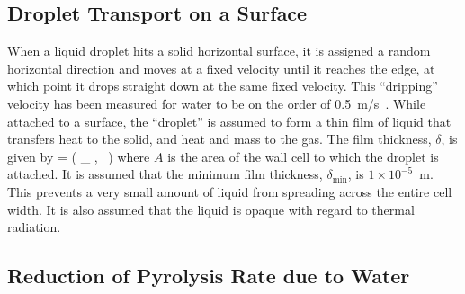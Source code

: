 \subsection{Droplet Transport on a Surface}

When a liquid droplet hits a solid horizontal surface, it is assigned a
random horizontal direction and moves at a fixed velocity until it
reaches the edge, at which point it drops straight down at the same
fixed velocity. This ``dripping'' velocity has been measured for water to be on
the order of 0.5~m/s~\cite{Hamins:1,Hamins:IAFSS2002}.
While attached to a surface, the ``droplet'' is assumed to form a thin film of liquid that
transfers heat to the solid, and heat and mass to
the gas. The film thickness, $\delta$, is given by
\be
   \delta = \max \left( \delta_{\min} , \sum {} \,  \right)
\ee
where $A$ is the area of the wall cell to which the droplet is attached. It is assumed that the minimum film thickness, $\delta_{\min}$, is $1 \times 10^{-5}$~m. This prevents a very small amount of liquid from spreading across the entire cell width. It is also assumed that the liquid is opaque with regard to thermal radiation.

\subsection{Reduction of Pyrolysis Rate due to Water}

